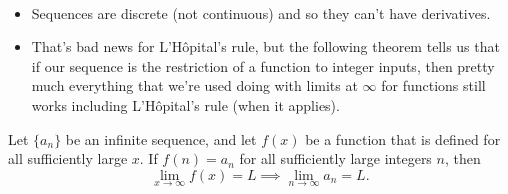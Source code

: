 \newpage

\begin{remark}\,
\begin{itemize}
\item Sequences are discrete (not continuous) and so they can't have derivatives.
\item That's bad news for L'H\^opital's rule, but the following theorem tells us that if our sequence is the restriction of a function to integer inputs, then pretty much everything that we're used doing with limits at $\infty$ for functions still works including L'H\^opital's rule (when it applies).
\end{itemize}
\end{remark}

\begin{theorem}
Let $\{a_n\}$ be an infinite sequence, and let $f(x)$ be a function that is defined for all sufficiently large $x$.
If $f(n) = a_n$ for all sufficiently large integers $n$, then
\begin{equation*}
\lim_{x\to\infty}f(x) = L \implies \lim_{n\to\infty} a_n=  L.
\end{equation*}
\end{theorem}

